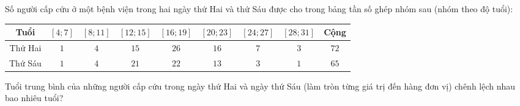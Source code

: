 \begin{ex}
Số người cấp cứu ở một bệnh viện trong hai ngày thứ Hai và thứ Sáu được cho trong bảng tần số ghép nhóm sau (nhóm theo độ tuổi):
\begin{center}
\begin{tabular}{|c|c|c|c|c|c|c|c|c|}\hline
Tuổi & $[4;7]$ & $[8;11]$ & $[12;15]$ & $[16;19]$ & $[20;23]$ & $[24;27]$ & $[28;31]$ & Cộng\\\hline
Thứ Hai & $1$ & $4$ & $15$ & $26$ & $16$ & $7$ & $3$ & $72$\\\hline
Thứ Sáu & $1$ & $4$ & $21$ & $22$ & $13$ & $3$ & $1$ & $65$\\\hline
\end{tabular}
\end{center}
Tuổi trung bình của những người cấp cứu trong ngày thứ Hai và ngày thứ Sáu (làm tròn từng giá trị đến hàng đơn vị) chênh lệch nhau bao nhiêu tuổi?
\end{ex}

